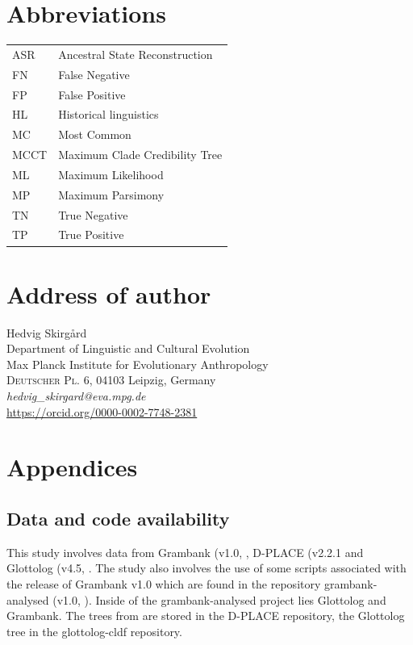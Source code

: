 \documentclass[12pt,letterpaper]{article}
\begin{document}
\section*{Abbreviations}
\begin{tabular}{p{3cm} p{10cm} }
ASR & Ancestral State Reconstruction\\
FN & False Negative \\
FP & False Positive \\
HL & Historical linguistics\\
MC & Most Common \\
MCCT & Maximum Clade Credibility Tree \\
ML & Maximum Likelihood \\
MP &Maximum Parsimony \\
TN & True Negative\\
TP & True Positive \\
\end{tabular}




\newpage
\section*{Address of author}
Hedvig Skirgård\\
Department of Linguistic and Cultural Evolution\\
Max Planck Institute for Evolutionary Anthropology\\
\textsc{Deutscher Pl. 6, 04103}
Leipzig, Germany\\
\textit{hedvig\_{}skirgard@eva.mpg.de}\\
\url{https://orcid.org/0000-0002-7748-2381}






\newpage

\appendix
\section*{Appendices}
\renewcommand{\thesubsection}{\Alph{subsection}}

\subsection{Data and code availability}
\label{supp_data_availability}
This study involves data from Grambank (v1.0, \cite{grambank_dataset_zenodo_v1, grambank_release}, D-PLACE (v2.2.1 \citet{d_place_all} and Glottolog (v4.5, \citet{glottolog4_5}. The study also involves the use of some scripts associated with the release of Grambank v1.0 which are found in the repository grambank-analysed (v1.0, \citet{grambank_analysed_1_0}). Inside of the grambank-analysed project lies Glottolog and Grambank. The trees from \citet{grayetal_2009} are stored in the D-PLACE repository, the Glottolog tree in the glottolog-cldf repository.
\end{document}
